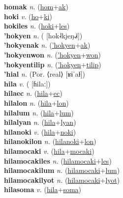\textbf{homak} \textit{n.} (\hyperref[hom]{hom}+\hyperref[ak]{ak})
 \label{homak} \\
\textbf{hoki} \textit{v.} (\hyperref[ho]{ho}+\hyperref[ki]{ki})
 \label{hoki} \\
\textbf{hokiles} \textit{n.} (\hyperref[hoki]{hoki}+\hyperref[les]{les})
 \label{hokiles} \\
\textbf{'hokyen} \textit{n.} ( [hok˨kjeŋ˨˩˧])
 \label{'hokyen} \\
\textbf{'hokyenak} \textit{n.} (\hyperref['hokyen]{'hokyen}+\hyperref[ak]{ak})
 \label{'hokyenak} \\
\textbf{'hokyenwon} \textit{n.} (\hyperref['hokyen]{'hokyen}+\hyperref[won]{won})
 \label{'hokyenwon} \\
\textbf{'hokyentilip} \textit{n.} (\hyperref['hokyen]{'hokyen}+\hyperref[tilip]{tilip})
 \label{'hokyentilip} \\
\textbf{'hial} \textit{n.} (Por. ⟨real⟩ [ʁɨˈaɫ])
 \label{'hial} \\
\textbf{hila} \textit{v.} ( [ɦilaː])
 \label{hila} \\
\textbf{hilaec} \textit{n.} (\hyperref[hila]{hila}+\hyperref[ec]{ec})
 \label{hilaec} \\
\textbf{hilalon} \textit{n.} (\hyperref[hila]{hila}+\hyperref[lon]{lon})
 \label{hilalon} \\
\textbf{hilalum} \textit{n.} (\hyperref[hila]{hila}+\hyperref[lum]{lum})
 \label{hilalum} \\
\textbf{hilalyan} \textit{n.} (\hyperref[hila]{hila}+\hyperref[lyan]{lyan})
 \label{hilalyan} \\
\textbf{hilanoki} \textit{v.} (\hyperref[hila]{hila}+\hyperref[noki]{noki})
 \label{hilanoki} \\
\textbf{hilanokilon} \textit{n.} (\hyperref[hilanoki]{hilanoki}+\hyperref[lon]{lon})
 \label{hilanokilon} \\
\textbf{hilamocaki} \textit{v.} (\hyperref[hila]{hila}+\hyperref[mocaki]{mocaki})
 \label{hilamocaki} \\
\textbf{hilamocakiles} \textit{n.} (\hyperref[hilamocaki]{hilamocaki}+\hyperref[les]{les})
 \label{hilamocakiles} \\
\textbf{hilamocakilum} \textit{n.} (\hyperref[hilamocaki]{hilamocaki}+\hyperref[lum]{lum})
 \label{hilamocakilum} \\
\textbf{hilamocakilyot} \textit{n.} (\hyperref[hilamocaki]{hilamocaki}+\hyperref[lyot]{lyot})
 \label{hilamocakilyot} \\
\textbf{hilasoma} \textit{v.} (\hyperref[hila]{hila}+\hyperref[soma]{soma})
